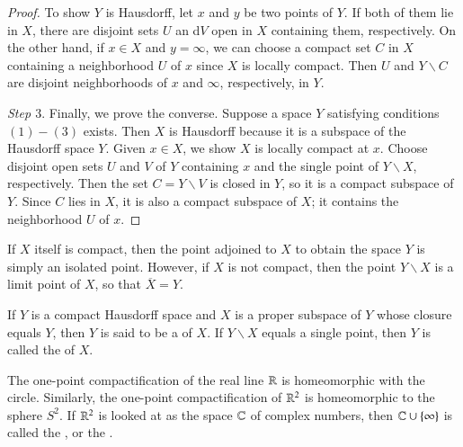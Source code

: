 \documentclass[12pt, a4paper, oneside, openright, titlepage]{book}
\begin{document}
\begin{proof}
    To show $Y$ is Hausdorff, let $x$ and $y$ be two points of $Y$. If both of them lie in $X$, there are disjoint sets $U$ an d$V$ open in $X$ containing them, respectively. On the other hand, if $x \in X$ and $y = \infty$, we can choose a compact set $C$ in $X$ containing a neighborhood $U$ of $x$ since $X$ is locally compact. Then $U$ and $Y\backslash C$ are disjoint neighborhoods of $x$ and $\infty$, respectively, in $Y$.

    \emph{Step $3.$} Finally, we prove the converse. Suppose a space $Y$ satisfying conditions $(1)-(3)$ exists. Then $X$ is Hausdorff because it is a subspace of the Hausdorff space $Y$. Given $x \in X$, we show $X$ is locally compact at $x$. Choose disjoint open sets $U$ and $V$ of $Y$ containing $x$ and the single point of $Y\backslash X$, respectively. Then the set $C = Y\backslash V$ is closed in $Y$, so it is a compact subspace of $Y$. Since $C$ lies in $X$, it is also a compact subspace of $X$; it contains the neighborhood $U$ of $x$.
\end{proof}

If $X$ itself is compact, then the point adjoined to $X$ to obtain the space $Y$ is simply an isolated point. However, if $X$ is not compact, then the point $Y\backslash X$ is a limit point of $X$, so that $\overline{X} = Y$.


\begin{definition}
    If $Y$ is a compact Hausdorff space and $X$ is a proper subspace of $Y$ whose closure equals $Y$, then $Y$ is said to be a  of $X$. If $Y\backslash X$ equals a single point, then $Y$ is called the  of $X$.
\end{definition}

\begin{example}
    The one-point compactification of the real line $\mathbb R$ is homeomorphic with the circle. Similarly, the one-point compactification of $\mathbb R^2$ is homeomorphic to the sphere $S^2$. If $\mathbb R^2$ is looked at as the space $\mathbb C$ of complex numbers, then $\mathbb C\cup\{\infty\}$ is called the , or the .
\end{example}
\end{document}
